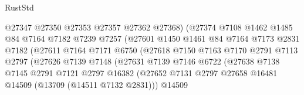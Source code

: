 \begin{lexlean}{RustStd}
\begin{coremodule}
                                  @27347
                                  @27350
                                  @27353
                                  @27357
                                  @27362
                                  @27368)
                                (@27374
                                  @7108
                                  @1462
                                  @1485
                                  @84
                                  @7164
                                  @7182
                                  @7239
                                  @7257
                                  (@27601
                                    @1450
                                    @1461
                                    @84
                                    @7164
                                    @7173
                                    @2831
                                    @7182
                                    (@27611
                                      @7164
                                      @7171
                                      @6750
                                      (@27618
                                        @7150
                                        @7163
                                        @7170
                                        @2791
                                        @7113
                                        @2797
                                        (@27626
                                          @7139
                                          @7148
                                          (@27631
                                            @7139
                                            @7146
                                            @6722
                                            (@27638
                                              @7138
                                              @7145
                                              @2791
                                              @7121
                                              @2797
                                              @16382
                                              (@27652
                                                @7131
                                                @2797
                                                @27658
                                                @16481
                                                @14509
                                                (@13709 (@14511 @7132 @2831)))
                                              @14509

\end{coremodule}
\end{lexlean}
